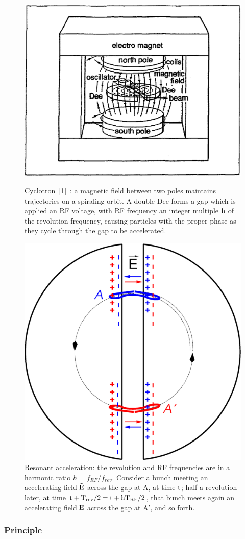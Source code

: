 \begin{figure}[ht]
\centering
\sidebyside
{
    \includegraphics[width=0.45\linewidth]{./figs_cyclo/LBLCycloSketch.eps}
    \caption{\label{FigLBLCycloSketch}
Cyclotron~[1]~: a magnetic field between 
two poles maintains trajectories on a spiraling orbit. A double-Dee  forms a gap which is applied an RF voltage, 
with RF frequency an integer multiple $\rm h$ of the revolution frequency, 
 causing particles with the proper phase as they cycle through the gap to be accelerated.} %
}{
    \includegraphics[width=0.38\linewidth]{./figs_cyclo/dees.eps}
    \caption{  \label{FigPSICyclo}
Resonant acceleration: 
the revolution and RF frequencies are in a harmonic ratio $h= f_{RF} / f_{rev} $. 
Consider a bunch meeting an accelerating field $\rm \vec E$ across the gap at A, at time $\rm t$;
half a revolution later, at time  $\rm t +T_{rev}/2 = t + h T_{RF}/2$,  that bunch meets again 
an accelerating field $\rm \vec E$ across the gap at A', and so forth. 
}
}
\end{figure}

\subsubsection*{Principle}

